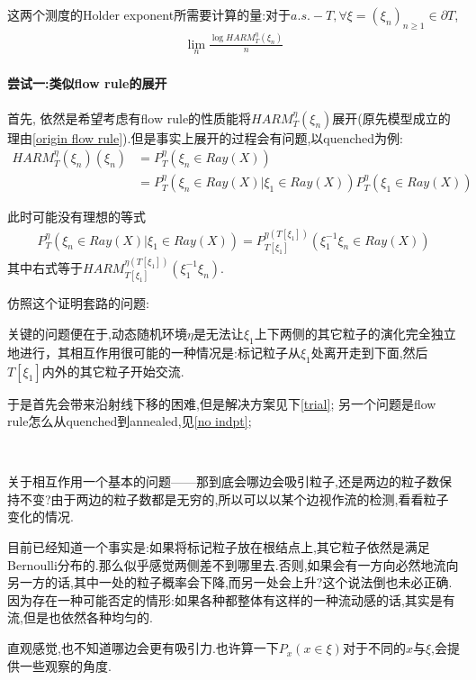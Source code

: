 \documentclass[a4paper,oneside]{ctexbook}
\begin{document}
			这两个测度的Holder exponent所需要计算的量:对于$a.s. - T, \forall \xi = (\xi_n)_{n \ge 1} \in \partial T$,
			\begin{align}
				\lim\limits_{n}\frac{\log HARM^{\eta}_T(\xi_n)}{n}
				\label{holderexponent}
			\end{align}


			\paragraph*{尝试一:类似flow rule的展开}
			\quad %

				首先, 依然是希望考虑有flow rule的性质能将$HARM^{\eta}_T(\xi_n)$展开(原先模型成立的理由\ref{origin flow rule}).但是事实上展开的过程会有问题,以quenched为例:
				\begin{align*}
					HARM^{\eta}_T(\xi_n)(\xi_n) &= P^{\eta}_T( \xi_n \in Ray(X) ) \\
					&= P^{\eta}_T( \xi_n \in Ray(X) | \xi_1 \in Ray(X))  P^{\eta}_T( \xi_1 \in Ray(X) )
				\end{align*}
				
				此时可能没有理想的等式
				\begin{align}
					P^{\eta}_T( \xi_n \in Ray(X) | \xi_1 \in Ray(X)) 
					= P^{\eta(T[\xi_1])}_{T[\xi_1]}( \xi_1^{-1}\xi_n \in Ray(X) )
					\label{shiftdown}
				\end{align}
				其中右式等于$HARM^{\eta(T[\xi_1])}_{T[\xi_1]}(\xi_1^{-1}\xi_n)$.

				仿照这个证明套路的问题:

				关键的问题便在于,动态随机环境$\eta$是无法让$\xi_1$上下两侧的其它粒子的演化完全独立地进行，其相互作用很可能的一种情况是:标记粒子从$\xi_1$处离开走到下面,然后$T[\xi_1]$内外的其它粒子开始交流.

				于是首先会带来沿射线下移的困难,但是解决方案见下\ref{trial};
				另一个问题是flow rule怎么从quenched到annealed,见\ref{no indpt};

				\begin{que}
					\label{flow}
					\ 

					关于相互作用一个基本的问题——那到底会哪边会吸引粒子,还是两边的粒子数保持不变?由于两边的粒子数都是无穷的,所以可以以某个边视作流的检测,看看粒子变化的情况.

					目前已经知道一个事实是:如果将标记粒子放在根结点上,其它粒子依然是满足Bernoulli分布的.那么似乎感觉两侧差不到哪里去.否则,如果会有一方向必然地流向另一方的话,其中一处的粒子概率会下降,而另一处会上升?这个说法倒也未必正确.因为存在一种可能否定的情形:如果各种都整体有这样的一种流动感的话,其实是有流,但是也依然各种均匀的.

					直观感觉,也不知道哪边会更有吸引力.也许算一下$P_x(x\in \xi)$对于不同的$x$与$\xi$,会提供一些观察的角度.

				\end{que}
\end{document}

